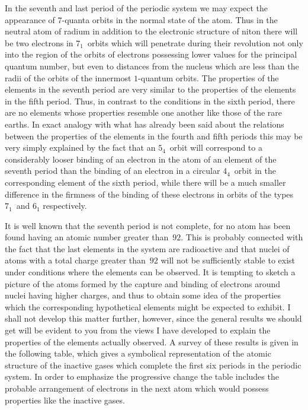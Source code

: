  In the seventh and last period of the periodic
system we may expect the appearance of $7$-quanta orbits in the
normal state of the atom. Thus in the neutral atom of radium in
addition to the electronic structure of niton there will be two
electrons in $7_{1}$~orbits which will penetrate during their revolution
not only into the region of the orbits of electrons possessing lower
values for the principal quantum number, but even to distances
from the nucleus which are less than the radii of the orbits of the
innermost $1$-quantum orbits. The properties of the elements in the
seventh period are very similar to the properties of the elements in the
fifth period. Thus, in contrast to the conditions in the sixth period,
there are no elements whose properties resemble one another like
those of the rare earths. In exact analogy with what has already
been said about the relations between the properties of the elements
in the fourth and fifth periods this may be very simply explained by
the fact that an  $5_{4}$~orbit will correspond to a considerably
looser binding of an electron in the atom of an element of the
seventh period than the binding of an electron in a circular $4_{4}$~orbit
in the corresponding element of the sixth period, while there will be
a much smaller difference in the firmness of the binding of these
electrons in orbits of the types $7_{1}$~and $6_{1}$ respectively.

It is well known that the seventh period is not complete, for no atom
has been found having an atomic number greater than~$92$. This is
probably connected with the fact that the last elements in the
system are radioactive and that nuclei of atoms with a total charge
greater than~$92$ will not be sufficiently stable to exist under conditions
where the elements can be observed. It is tempting to
sketch a picture of the atoms formed by the capture and binding
of electrons around nuclei having higher charges, and thus to
obtain some idea of the properties which the corresponding hypothetical
elements might be expected to exhibit. I shall not develop
this matter further, however, since the general results we should
get will be evident to you from the views I have developed to
explain the properties of the elements actually observed. A survey
of these results is given in the following table, which gives a symbolical
representation of the atomic structure of the inactive gases
which complete the first six periods in the periodic system. In
order to emphasize the progressive change the table includes the
probable arrangement of electrons in the next atom which would
possess properties like the inactive gases.

